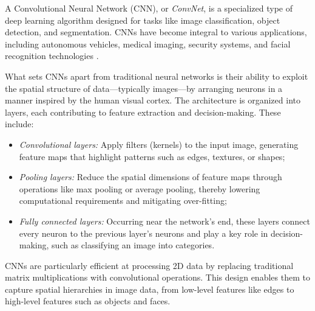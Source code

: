 A Convolutional Neural Network (CNN), or \textit{ConvNet}, is a specialized type of deep learning algorithm designed for tasks like image classification, object detection, and segmentation. CNNs have become integral to various applications, including autonomous vehicles, medical imaging, security systems, and facial recognition technologies \cite{DBLP:journals/corr/OSheaN15}. 

What sets CNNs apart from traditional neural networks is their ability to exploit the spatial structure of data—typically images—by arranging neurons in a manner inspired by the human visual cortex. The architecture is organized into layers, each contributing to feature extraction and decision-making. These include:

\begin{itemize}
    \item \textit{Convolutional layers:} Apply filters (kernels) to the input image, generating feature maps that highlight patterns such as edges, textures, or shapes;
    \item \textit{Pooling layers:} Reduce the spatial dimensions of feature maps through operations like max pooling or average pooling, thereby lowering computational requirements and mitigating over-fitting;
    \item \textit{Fully connected layers:} Occurring near the network's end, these layers connect every neuron to the previous layer's neurons and play a key role in decision-making, such as classifying an image into categories.
\end{itemize}

CNNs are particularly efficient at processing 2D data by replacing traditional matrix multiplications with convolutional operations. This design enables them to capture spatial hierarchies in image data, from low-level features like edges to high-level features such as objects and faces.

